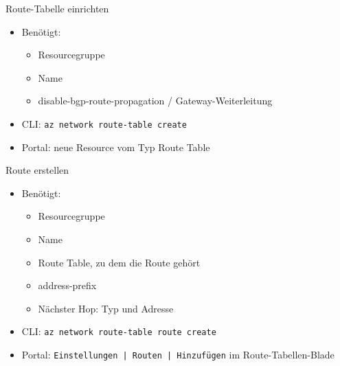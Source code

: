 \begin{flashcard}[Definition]{Route-Tabelle einrichten}
    \begin{itemize}
        \item Benötigt:
            \begin{itemize}
                \item Resourcegruppe
                \item Name
                \item disable-bgp-route-propagation / Gateway-Weiterleitung
            \end{itemize}
        \item CLI: \texttt{az network route-table create}
        \item Portal: neue Resource vom Typ Route Table
    \end{itemize}
\end{flashcard}

\begin{flashcard}[Definition]{Route erstellen}
    \begin{itemize}
        \item Benötigt:
            \begin{itemize}
                \item Resourcegruppe
                \item Name
                \item Route Table, zu dem die Route gehört
                \item address-prefix
                \item Nächster Hop: Typ und Adresse
            \end{itemize}
        \item CLI: \texttt{az network route-table route create}
        \item Portal: \texttt{Einstellungen | Routen | Hinzufügen} im Route-Tabellen-Blade
    \end{itemize}
\end{flashcard}

